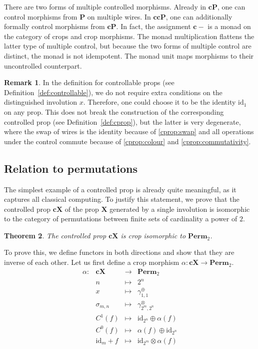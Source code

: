 \documentclass[a4paper]{article}
\theoremstyle{plain}
\newtheorem{theorem}{Theorem}
\theoremstyle{definition}
\newtheorem{remark}[theorem]{Remark}
\newcommand{\cat}[1]{\mathbf{#1}}
\newcommand{\ccat}[1]{\mathbf{c #1}}
\newcommand{\symtimes}{\gamma^\otimes}
\newcommand{\symplus}{\gamma^\oplus}
\newcommand{\iid}{\mathrm{id}}
\begin{document}
There are two forms of multiple controlled morphisms. Already in
$\ccat{\cat{P}}$, one can control morphisms from $\cat{P}$ on multiple wires.
In $\ccat{\ccat{\cat{P}}}$, one can additionally formally control morphisms
from $\ccat{\cat{P}}$.
In fact, the assignment $\mathbf{c}-$ is a monad on the category of crops and
crop morphisms. The monad multiplication flattens the latter type of multiple
control, but because the two forms of multiple control are distinct, the monad
is not idempotent. The monad unit maps morphisms to their uncontrolled
counterpart.

\begin{remark}
	In the definition for controllable props (see
	Definition~\ref{def:controllable}), we do not require extra conditions on
	the distinguished involution $x$. Therefore, one could choose it to be the
	identity $\iid_1$ on any prop. This does not break the construction of the
	corresponding controlled prop (see Definition~\ref{def:cprop}), but the
	latter is very degenerate, where the swap of wires is the identity because
	of \ref{cprop:swap} and all operations under the control commute because of
	\ref{cprop:colour} and \ref{cprop:commutativity}.
\end{remark}

\subsection{Relation to permutations}
The simplest example of a controlled prop is already quite meaningful, as it captures
all classical computing. To justify this statement, we prove that the controlled
prop $\ccat X$ of the prop $\cat X$ generated by a single involution is
isomorphic to the category of permutations between finite sets of cardinality a power of $2$.

\begin{theorem}
	\label{th:cx-iso}
	The controlled prop $\ccat X$ is crop isomorphic to $\cat{Perm}_2$.
\end{theorem}

To prove this, we define functors in both directions and show that they are
inverse of each other. Let us first define a crop morphism $\alpha \colon \ccat
X \to \cat{Perm}_2$.
\[
	\begin{array}{lcll}
		\alpha \colon & \ccat X & \to & \cat{Perm}_2 \\[1ex]
		& n & \mapsto & 2^n \\[1ex]
		& x & \mapsto & \symplus_{1,1} \\[1ex]
		& \sigma_{m,n} & \mapsto & \symtimes_{2^m,2^n} \\[1ex]
		& C^1(f) & \mapsto & \iid_{2^n} \oplus \alpha(f) \\[1ex]
		& C^0(f) & \mapsto & \alpha(f) \oplus \iid_{2^n} \\[1ex]
		& \iid_m + f & \mapsto & \iid_{2^m} \otimes \alpha(f)
	\end{array}
\]
\end{document}
